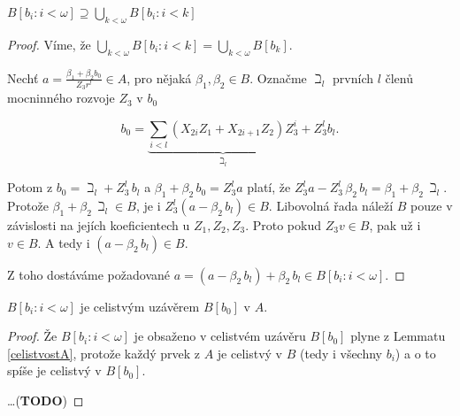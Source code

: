 \documentclass[11pt,a4paper]{article}
\theoremstyle{definition}
\theoremstyle{plain}
\begin{document}
\lemma[VII.7, jen strana nepožadující ($p=2$)] $B[b_i : i < \omega] \supseteq
\bigcup_{k < \omega} B[b_i : i < k]$
\begin{proof}
	Víme, že $\bigcup_{k < \omega} B[b_i : i < k] = \bigcup_{k < \omega}
	B[b_k]$.

	Nechť $a = \frac{\beta_1 + \beta_2 b_0}{Z_3r^l} \in A$, pro nějaká
	$\beta_1, \beta_2 \in B$. Označme $\beth_l$ prvních $l$ členů mocninného
	rozvoje $Z_3$ v $b_0$
	
	\[ b_0 = \underbrace{\sum_{i < l} (X_{2i} Z_1 + X_{2i+1} Z_2)
	Z_3^i}_{\beth_l} + Z_3^l b_l. \]

	Potom z $b_0 = \beth_l + Z_3^l\,b_l$ a $\beta_1 + \beta_2\,b_0 = Z_3^l a$
	platí, že $Z_3^l a - Z_3^l\,\beta_2\,b_l = \beta_1 + \beta_2\,\beth_l$.
	Protože $\beta_1 + \beta_2\,\beth_l \in B$, je i $Z_3^l (a - \beta_2\,b_l)
	\in B$. Libovolná řada náleží $B$ pouze v závislosti na jejích
	koeficientech u $Z_1, Z_2, Z_3$. Proto pokud $Z_3 v \in B$, pak už i $v \in
	B$. A tedy i $(a - \beta_2\,b_l) \in B$.

	Z toho dostáváme požadované $a = (a - \beta_2\,b_l) + \beta_2\,b_l \in B[b_i
	: i < \omega]$.
\end{proof}

\veta $B[b_i : i < \omega]$ je celistvým uzávěrem $B[b_0]$ v $A$.
\begin{proof}
	Že $B[b_i : i < \omega]$ je obsaženo v celistvém uzávěru $B[b_0]$ plyne z
	Lemmatu \ref{celistvostA}, protože každý prvek z $A$ je celistvý v $B$
	(tedy i všechny $b_i$) a o to spíše je celistvý v $B[b_0]$.

	\dots (\textbf{TODO})
\end{proof}
\end{document}
